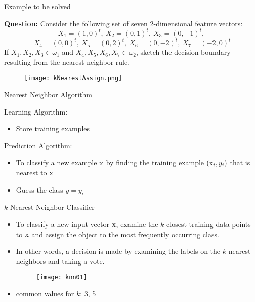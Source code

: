 \begin{frame}{Example to be solved}

{\bf \color{mycolor2}Question:} Consider the following set of seven 2-dimensional feature vectors:
\begin{equation}
X_1=(1,0)^t,~X_2=(0,1)^t,~X_3=(0,-1)^t, \nonumber
\end{equation}
\begin{equation}
 ~X_4=(0,0)^t,~X_5=(0,2)^t,~X_6=(0,-2)^t, ~X_7=(-2,0)^t\nonumber
\end{equation}
If $X_1,X_2,X_3\in \omega_1$ and $X_4,X_5,X_6,X_7\in \omega_2$, sketch the decision boundary resulting from the nearest neighbor rule.
\begin{figure}
\texttt{[image: kNearestAssign.png]}
\end{figure}
\end{frame}

\begin{frame}{Nearest Neighbor Algorithm}

{\color{mycolor2}Learning Algorithm:}
\begin{itemize}
\item Store training examples
\end{itemize}
{\color{mycolor2}Prediction Algorithm:}
\begin{itemize}
\item To classify a new example ${\rm x}$ by finding the training example $({\rm x}_i,y_i)$ that is nearest to ${\rm x}$
\item Guess the class $y =y_i$
\end{itemize}
\end{frame}

\begin{frame}{$k$-Nearest Neighbor Classifier}
\begin{itemize}
\item To classify a new input vector ${\rm x}$, examine the $k$-closest training data points to ${\rm x}$ and assign the object to the most frequently occurring class.
\item In other words, a decision is made by examining the labels on the $k$-nearest neighbors and taking a vote.
\begin{figure}
\texttt{[image: knn01]}
\end{figure}
\item common values for $k$: 3, 5
\end{itemize}
\end{frame}



